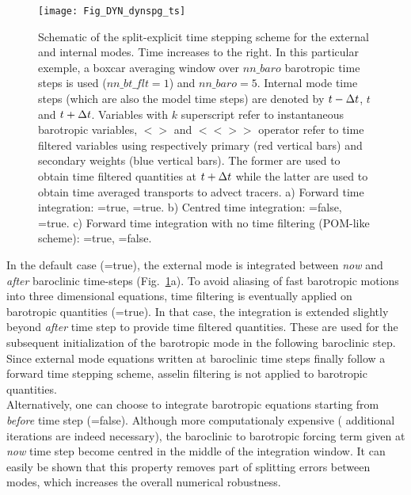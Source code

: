 \documentclass[NEMO_book]{subfiles}
\begin{document}
\begin{figure}[!t]    \begin{center}
\texttt{[image: Fig\_DYN\_dynspg\_ts]}
\caption{  \label{Fig_DYN_dynspg_ts}
Schematic of the split-explicit time stepping scheme for the external 
and internal modes. Time increases to the right. In this particular exemple, 
a boxcar averaging window over $nn\_baro$ barotropic time steps is used ($nn\_bt\_flt=1$) and $nn\_baro=5$.
Internal mode time steps (which are also the model time steps) are denoted 
by $t-\Delta t$, $t$ and $t+\Delta t$. Variables with $k$ superscript refer to instantaneous barotropic variables, 
$< >$ and $<< >>$ operator refer to time filtered variables using respectively primary (red vertical bars) and secondary weights (blue vertical bars). 
The former are used to obtain time filtered quantities at $t+\Delta t$ while the latter are used to obtain time averaged 
transports to advect tracers.
a) Forward time integration: =true, =true. 
b) Centred time integration: =false, =true. 
c) Forward time integration with no time filtering (POM-like scheme): =true, =false. }
\end{center}    \end{figure}

In the default case (=true), the external mode is integrated 
between \textit{now} and  \textit{after} baroclinic time-steps (Fig.~\ref{Fig_DYN_dynspg_ts}a). To avoid aliasing of fast barotropic motions into three dimensional equations, time filtering is eventually applied on barotropic 
quantities (=true). In that case, the integration is extended slightly beyond  \textit{after} time step to provide time filtered quantities. 
These are used for the subsequent initialization of the barotropic mode in the following baroclinic step. 
Since external mode equations written at baroclinic time steps finally follow a forward time stepping scheme, 
asselin filtering is not applied to barotropic quantities. \\
Alternatively, one can choose to integrate barotropic equations starting 
from \textit{before} time step (=false). Although more computationaly expensive (  additional iterations are indeed necessary), the baroclinic to barotropic forcing term given at \textit{now} time step 
become centred in the middle of the integration window. It can easily be shown that this property 
removes part of splitting errors between modes, which increases the overall numerical robustness.
\end{document}
